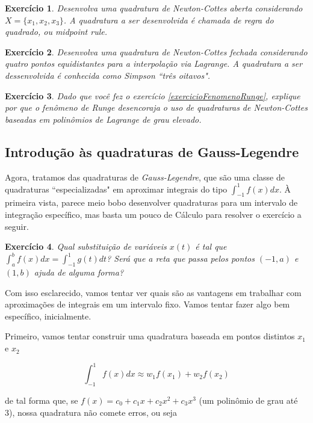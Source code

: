 \documentclass[]{article}
\newtheorem{exercicio}{Exercício}
\numberwithin{equation}{section}
\begin{document}
\begin{exercicio}
	Desenvolva uma quadratura de Newton-Cottes aberta considerando $X = \{x_1, x_2, x_3\}$. A quadratura a ser desenvolvida é chamada de regra do quadrado, ou \emph{midpoint rule}.
\end{exercicio}

\begin{exercicio}
	Desenvolva uma quadratura de Newton-Cottes fechada considerando quatro pontos equidistantes para a interpolação via Lagrange. A quadratura a ser dessenvolvida é conhecida como Simpson ``três oitavos".
\end{exercicio}

\begin{exercicio}
	Dado que você fez o exercício \ref{exercicioFenomenoRunge}, explique por que o fenômeno de Runge desencoraja o uso de quadraturas de Newton-Cottes baseadas em polinômios de Lagrange de grau elevado.
\end{exercicio}

\subsection{Introdução às quadraturas de Gauss-Legendre}

Agora, tratamos das quadraturas de \emph{Gauss-Legendre}, que são uma classe de quadraturas ``especializadas" em aproximar integrais do tipo $\int_{-1}^{1} f(x) dx$. À primeira vista, parece meio bobo desenvolver quadraturas para um intervalo de integração específico, mas basta um pouco de Cálculo para resolver o exercício a seguir.

\begin{exercicio}
	Qual substituição de variáveis $x(t)$ é tal que $\int_{a}^{b} f(x) dx = \int_{-1}^{1} g(t) dt$? Será que a reta que passa pelos pontos $(-1, a)$ e $(1, b)$ ajuda de alguma forma?
\end{exercicio}

Com isso esclarecido, vamos tentar ver quais são as vantagens em trabalhar com aproximações de integrais em um intervalo fixo. Vamos tentar fazer algo bem específico, inicialmente.

Primeiro, vamos tentar construir uma quadratura baseada em pontos distintos $x_1$ e $x_2$

$$
\int_{-1}^{1} f(x) dx \approx w_1 f(x_1) + w_2 f(x_2)
$$

de tal forma que, se $f(x) = c_0 + c_1x + c_2x^2 + c_3x^3$ (um polinômio de grau até 3), nossa quadratura não comete erros, ou seja
\end{document}
